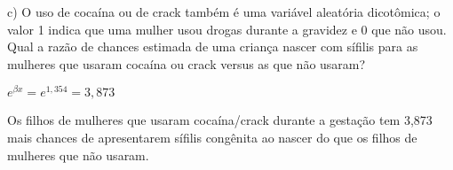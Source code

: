 \documentclass[12pt,a4paper]{article}
\begin{document}
	\vspace{1cm}	
	c) O uso de cocaína ou de crack também é uma variável aleatória dicotômica; o valor 1 indica que uma mulher usou drogas durante a gravidez e 0 que não usou. Qual a razão de chances estimada de uma criança nascer com sífilis para as mulheres que usaram cocaína ou crack versus as que não usaram?
	\vspace{0.5cm}
	\begin{center}
		$e^{\beta x} = e^{1,354} = 3,873$
	\end{center}
	\vspace{0.5cm}
	Os filhos de mulheres que usaram cocaína/crack durante a gestação tem 3,873 mais chances de apresentarem sífilis congênita ao nascer do que os filhos de mulheres que não usaram.
\end{document}
